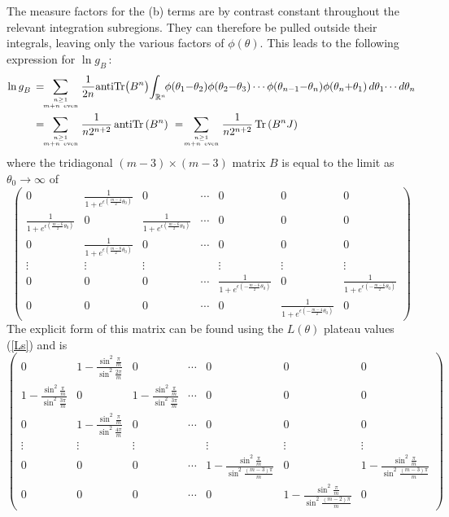 \documentclass[11pt]{article}
\newcommand\RR{{\mathbb R}}
\newcommand\phup{^{\phantom o}}
\newcommand\nn{\nonumber}
\newcommand{\te}{\theta}
\newcommand{\tz}{\theta_0}
\newcommand{\goB}{g\phup_{B}}
\begin{document}
The measure factors for the (b) terms are by contrast
constant throughout the relevant integration subregions. They
can therefore be pulled outside their
integrals, leaving only the various factors of
$\phi(\te)$. This leads to the following expression for 
$\ln \goB$\,:
\begin{align}
\ln \goB\,&=
\!\!\!\sum_{n\ge 1\atop m+n~{\rm even}}
\frac{1}{2n}\mbox{antiTr}\bigl(B^n\bigr)\!
\int_{\RR^n}\!\!\phi(\te_1{-}\te_2)\phi(\te_2{-}\te_3)
\cdots\phi(\te_{n-1}{-}\te_n)\phi(\te_n{+}\te_1)
\,d\theta_1\!\cdots d\te_n\nn \\
&=\!\!\!
\sum_{n\ge 1\atop m+n~{\rm even}}
\frac{1}{n2^{n+2}}\,\mbox{antiTr}\left(B^n\right)
\,\,=\!\!
\sum_{n\ge 1\atop m+n~{\rm even}}
\frac{1}{n2^{n+2}}\,\mbox{Tr}\left(B^nJ\right)
\label{g0b}
\end{align}
where the tridiagonal
$(m-3)\times(m-3)$ matrix $B$ is equal to the limit as $\tz\to\infty$ of
\[\left(\begin{array}{cccccccc}
0&\frac{1}{1+e^{\epsilon\left(\frac{m-4}{2}\tz\right)}}&0&\cdots&0&0&0\\
\frac{1}{1+e^{\epsilon\left(\frac{m-6}{2}\tz\right)}}&0&
\frac{1}{1+e^{\epsilon\left(\frac{m-6}{2}\tz\right)}}&\cdots&0&0&0\\
0&\frac{1}{1+e^{\epsilon\left(\frac{m-8}{2}\tz\right)}}&0&
\cdots&0&0&0\\[7pt]
\vdots&\vdots&\vdots&&\vdots&\vdots&\vdots\\[7pt]
0&0&0&\cdots&\frac{1}{1+e^{\epsilon\left(-\frac{m-6}{2}\tz\right)}}&0
&\frac{1}{1+e^{\epsilon\left(-\frac{m-6}{2}\tz\right)}}\\
0&0&0&\cdots&0&\frac{1}{1+e^{\epsilon\left(-\frac{m-4}{2}\tz\right)}}&0
\end{array}\right)
\]
The explicit form of this matrix can be found using the $L(\te)$ plateau 
values (\ref{Ls}) and is
\[
\left(\begin{array}{ccccccc}
0&1-\frac{\sin^2\frac{\pi}{m}}{\sin^2\frac{2\pi}{m}}&0&\cdots&0&0&0\\
1-\frac{\sin^2\frac{\pi}{m}}{\sin^2\frac{3\pi}{m}}&0&
1-\frac{\sin^2\frac{\pi}{m}}{\sin^2\frac{3\pi}{m}}&\cdots&0&0&0\\
0&1-\frac{\sin^2\frac{\pi}{m}}{\sin^2\frac{4\pi}{m}}&0&
\cdots&0&0&0\\[7pt]
\vdots&\vdots&\vdots&&\vdots&\vdots&\vdots\\[7pt]
0&0&0&\cdots&1-\frac{\sin^2\frac{\pi}{m}}{\sin^2\frac{(m-3)\pi}{m}}
&0&1-\frac{\sin^2\frac{\pi}{m}}{\sin^2\frac{(m-3)\pi}{m}}\\
0&0&0&\cdots&0&1-\frac{\sin^2\frac{\pi}{m}}{\sin^2\frac{(m-2)\pi}{m}}&0
\end{array}\right)
\]
\end{document}
